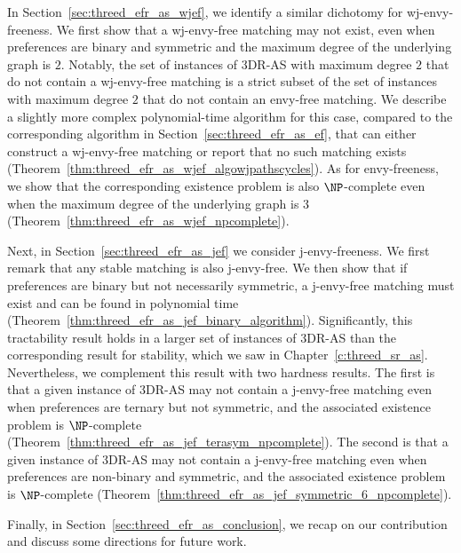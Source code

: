 In Section~\ref{sec:threed_efr_as_wjef}, we identify a similar dichotomy for wj-envy-freeness. We first show that a wj-envy-free matching may not exist, even when preferences are binary and symmetric and the maximum degree of the underlying graph is $2$. Notably, the set of instances of 3DR-AS with maximum degree $2$ that do not contain a wj-envy-free matching is a strict subset of the set of instances with maximum degree $2$ that do not contain an envy-free matching. We describe a slightly more complex polynomial-time algorithm for this case, compared to the corresponding algorithm in Section~\ref{sec:threed_efr_as_ef}, that can either construct a wj-envy-free matching or report that no such matching exists (Theorem~\ref{thm:threed_efr_as_wjef_algowjpathscycles}). As for envy-freeness, we show that the corresponding existence problem is also $\NP$-complete even when the maximum degree of the underlying graph is $3$ (Theorem~\ref{thm:threed_efr_as_wjef_npcomplete}).

Next, in Section~\ref{sec:threed_efr_as_jef} we consider j-envy-freeness. We first remark that any stable matching is also j-envy-free. We then show that if preferences are binary but not necessarily symmetric, a j-envy-free matching must exist and can be found in polynomial time (Theorem~\ref{thm:threed_efr_as_jef_binary_algorithm}). Significantly, this tractability result holds in a larger set of instances of 3DR-AS than the corresponding result for stability, which we saw in Chapter~\ref{c:threed_sr_as}. Nevertheless, we complement this result with two hardness results. The first is that a given instance of 3DR-AS may not contain a j-envy-free matching even when preferences are ternary but not symmetric, and the associated existence problem is $\NP$-complete (Theorem~\ref{thm:threed_efr_as_jef_terasym_npcomplete}). The second is that a given instance of 3DR-AS may not contain a j-envy-free matching even when preferences are non-binary and symmetric, and the associated existence problem is $\NP$-complete (Theorem~\ref{thm:threed_efr_as_jef_symmetric_6_npcomplete}).

Finally, in Section~\ref{sec:threed_efr_as_conclusion}, we recap on our contribution and discuss some directions for future work.
